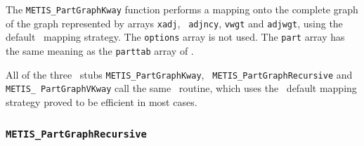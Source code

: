 \begin{itemize}
\progdes

The {\tt METIS\_PartGraphKway} function performs a mapping onto the
complete graph of the graph represented by arrays {\tt xadj}, {\tt
adjncy}, {\tt vwgt} and {\tt adjwgt}, using the default
\scotch\ mapping strategy. The {\tt options} array is not used. The
{\tt part} array has the same meaning as the {\tt parttab} array of
\scotch.

All of the three \metis\ stubs
{\tt METIS\_\lbo Part\lbo Graph\lbo Kway}, {\tt
METIS\_\lbo Part\lbo Graph\lbo Recursive} and {\tt METIS\_\lbo
Part\lbo Graph\lbo VKway} call the same \scotch\ routine, which uses
the \scotch\ default mapping strategy proved to be efficient in most
cases.
\end{itemize}

\subsubsection{{\tt METIS\_PartGraphRecursive}}

